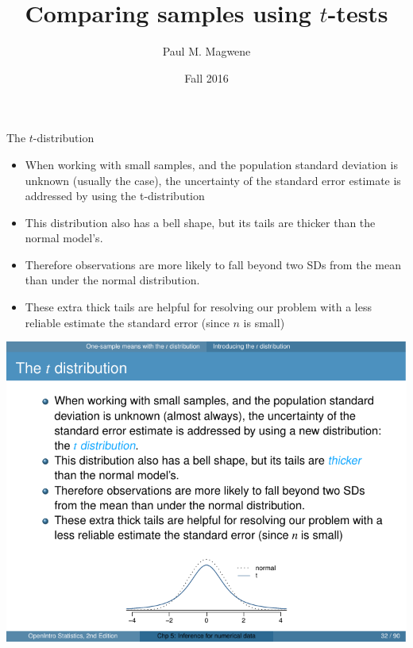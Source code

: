 \documentclass[presentation]{beamer}
\author{Paul M. Magwene}
\date{Fall 2016}
\title{Comparing samples using \(t\)-tests}
\begin{document}
\maketitle

\begin{frame}[label={sec:org7ba87ad}]{The \(t\)-distribution}
\begin{itemize}
\item When working with small samples, and the population standard deviation is unknown (usually the case), the uncertainty of the standard error estimate is addressed by using the \alert{\alert{t-distribution}}

\item This distribution also has a bell shape, but its tails are thicker than the normal model’s.

\item Therefore observations are more likely to fall beyond two SDs from the mean than under the normal distribution.

\item These extra thick tails are helpful for resolving our problem with a less reliable estimate the standard error (since \(n\) is small)
\end{itemize}

\begin{center}
\includegraphics[height=0.30\textheight]{fig-t-vs-normal.pdf}
\end{center}


\end{frame}
\end{document}
